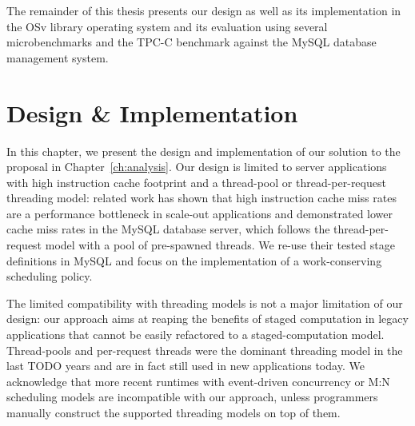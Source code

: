 \documentclass[12pt,a4paper]{book}
\begin{document}
The remainder of this thesis presents our design as well as its implementation in the OSv library operating system and its evaluation using several microbenchmarks and the TPC-C benchmark against the MySQL database management system.

\chapter{Design \& Implementation}
In this chapter, we present the design and implementation of our solution to the proposal in Chapter~\ref{ch:analysis}.
Our design is limited to server applications with high instruction cache footprint and a thread-pool or thread-per-request threading model:
related work has shown that high instruction cache miss rates are a performance bottleneck in scale-out applications
and demonstrated lower cache miss rates in the MySQL database server, which follows the thread-per-request model with a pool of pre-spawned threads.
We re-use their tested stage definitions in MySQL  and focus on the implementation of a work-conserving scheduling policy.
\cite{kanev2015profiling,mysqlThreading}

The limited compatibility with threading models is not a major limitation of our design:
our approach aims at reaping the benefits of staged computation in legacy applications that cannot be easily refactored to a staged-computation model.
Thread-pools and per-request threads were the dominant threading model in the last TODO years and are in fact still used in new applications today.
We acknowledge that more recent runtimes with event-driven concurrency or M:N scheduling models are incompatible with our approach, unless programmers manually construct the supported threading models on top of them.
\end{document}
